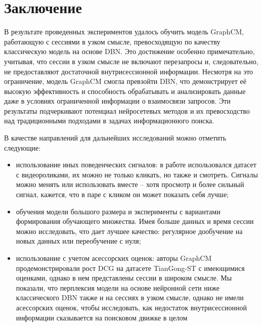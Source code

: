 \documentclass[diploma]{nanolab2015}
\begin{document}
\chapter{Заключение}
В результате проведенных экспериментов удалось обучить модель GraphCM, работающую с сессиями в узком смысле, превосходящую по качеству классическую модель на основе DBN. Это достижение особенно примечательно, учитывая, что сессии в узком смысле не включают перезапросы и, следовательно, не предоставляют достаточной внутрисессионной информации. Несмотря на это ограничение, модель GraphCM смогла превзойти DBN, что демонстрирует её высокую эффективность и способность обрабатывать и анализировать данные даже в условиях ограниченной информации о взаимосвязи запросов. Эти результаты подчеркивают потенциал нейросетевых методов и их превосходство над традиционными подходами в задачах информационного поиска.

В качестве направлений для дальнейших исследований можно отметить следующие:
\begin{itemize}
    \item использование иных поведенческих сигналов: в работе использовался датасет с видеороликами, их можно не только кликать, но также и смотреть. Сигналы можно менять или использовать вместе -- хотя просмотр и более сильный сигнал, кажется, что в паре с кликом он может показать себя лучше;
    \item обучения модели большого размера и эксперименты с вариантами формирования обучающего множества. Имея больше данных и время сессии можно исследовать, что дает лучшее качество: регулярное дообучение на новых данных или переобучение с нуля;
    \item использование с учетом асессорских оценок: авторы GraphCM продемонстрировали рост DCG на датасете TianGong-ST \cite{TianGong} с имеющимися оценками, однако в нем представлены сессии в широком смысле. Мы показали, что перплексия модели на основе нейронной сети ниже классического DBN также и на сессиях в узком смысле, однако не имели асессорских оценок, чтобы исследовать, как недостаток внутрисессионной информации сказывается на поисковом движке в целом
\end{itemize}
\end{document}
